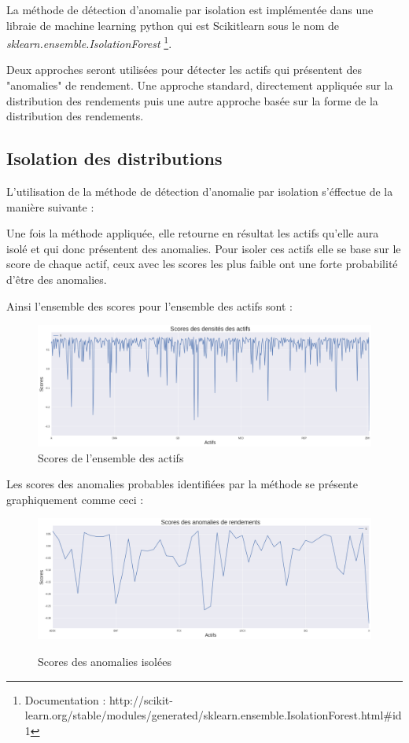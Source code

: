 La méthode de détection d'anomalie par isolation est implémentée  dans une libraie de machine learning python qui est Scikitlearn sous le nom de \emph{sklearn.ensemble.IsolationForest} \footnote{Documentation : http://scikit-learn.org/stable/modules/generated/sklearn.ensemble.IsolationForest.html\#id1}. 

Deux approches seront utilisées pour détecter les actifs qui présentent des "anomalies" de rendement. Une approche standard, directement appliquée sur la distribution des rendements puis une autre approche basée sur la forme de la distribution des rendements.

\subsection{Isolation des distributions}

L'utilisation de la méthode de détection d'anomalie par isolation s'éffectue de la manière suivante : 


Une fois la méthode appliquée, elle retourne en résultat les actifs qu'elle aura isolé et qui donc présentent des anomalies. Pour isoler ces actifs elle se base sur le score de chaque actif, ceux avec les scores les plus faible ont une forte probabilité d'être des anomalies.

Ainsi l'ensemble des scores pour l'ensemble des actifs sont : 


\begin{figure}[H]
\centering
\caption{Scores de l'ensemble des actifs}
   \includegraphics[scale=0.35]{img/scores_densite_all.png}
\end{figure}

Les scores des anomalies probables identifiées par la méthode se présente graphiquement comme ceci : 

\begin{figure}[H]
\centering
\caption{Scores des anomalies isolées}
   \includegraphics[scale=0.35]{img/scores_densite.png}
 \label{scoredensite}
\end{figure}

